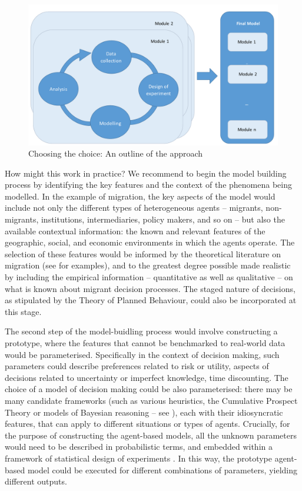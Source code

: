 \documentclass{article}
\begin{document}
\begin{figure}
\includegraphics[width=\textwidth]{process}
\caption{Choosing the choice: An outline of the approach \label{fig:approach}}
\end{figure}

How might this work in practice? We recommend to begin the model building process by identifying the key features and the context of the phenomena being modelled. In the example of migration, the key aspects of the model would include not only the different types of heterogeneous agents -- migrants, non-migrants, institutions, intermediaries, policy makers, and so on -- but also the available contextual information: the known and relevant features of the geographic, social, and economic environments in which the agents operate. The selection of these features would be informed by the theoretical literature on migration (see \citeauthor{Massey1993} \citeyear{Massey1993} for examples), and to the greatest degree possible made realistic by including the empirical information -- quantitative as well as qualitative -- on what is known about migrant decision processes. The staged nature of decisions, as stipulated by the Theory of Planned Behaviour, could also be incorporated at this stage.

The second step of the model-buidling process would involve constructing a prototype, where the features that cannot be benchmarked to real-world data would be parameterised. Specifically in the context of decision making, such parameters could describe preferences related to risk or utility, aspects of decisions related to uncertainty or imperfect knowledge, time discounting. The choice of a model of decision making could be also parameterised: there may be many candidate frameworks (such as various heuristics, the Cumulative Prospect Theory or models of Bayesian reasoning -- see \citeauthor{Gray2016} \citeyear{Gray2016}), each with their idiosyncratic features, that can apply to different situations or types of agents. Crucially, for the purpose of constructing the agent-based models, all the unknown parameters would need to be described in probabilistic terms, and embedded within a framework of statistical design of experiments \citet{Chaloner}. In this way, the prototype agent-based model could be executed for different combinations of parameters, yielding different outputs.
\end{document}
